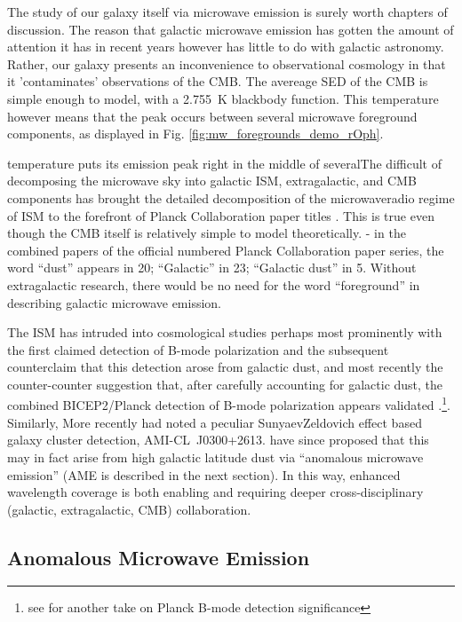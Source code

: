     The study of our galaxy itself via microwave emission is surely worth chapters of discussion. The reason that galactic microwave emission has gotten the amount of attention it has in recent years however has little to do with galactic astronomy. Rather, our galaxy presents an inconvenience to observational cosmology in that it 'contaminates' observations of the CMB. The avereage SED of the CMB is simple enough to model, with a 2.755~K blackbody function. This temperature however means that the peak occurs between several microwave foreground components, as displayed in Fig. \ref{fig:mw_foregrounds_demo_rOph}.

     temperature puts its emission peak right in the middle of severalThe difficult of decomposing the microwave sky into galactic ISM, extragalactic, and CMB components has brought the detailed decomposition of the microwave\-radio regime of ISM to the forefront of Planck Collaboration paper titles \citep{planckEarly11I,planck2013I,planck2015I}. This is true even though the CMB itself is relatively simple to model theoretically.
     - in the combined papers of the official numbered Planck Collaboration paper series, the word ``dust'' appears in 20; ``Galactic'' in 23; ``Galactic dust'' in 5. Without extragalactic research, there would be no need for the word ``foreground'' in describing galactic microwave emission.

    The ISM has intruded into cosmological studies perhaps most prominently with the first claimed detection of B-mode polarization \citep{hanson13, bicep214, flauger14} and the subsequent counter\-claim that this detection arose from galactic dust, and most recently the counter-counter suggestion that, after carefully accounting for galactic dust, the combined BICEP2/Planck detection of B-mode polarization appears validated \citep{planckIntL17}.\footnote{see \cite{sheehy17} for another take on Planck B-mode detection significance}. Similarly, More recently \cite{shimwell12} had noted a peculiar Sunyaev\-Zeldovich effect based galaxy cluster detection, AMI-CL~J0300+2613. \cite{perrott18} have since proposed that this may in fact arise from high galactic latitude dust via ``anomalous microwave emission'' (AME is described in the next section). In this way, enhanced wavelength coverage is both enabling and requiring deeper cross-disciplinary (galactic, extragalactic, CMB) collaboration.

  \subsection{Anomalous Microwave Emission}

